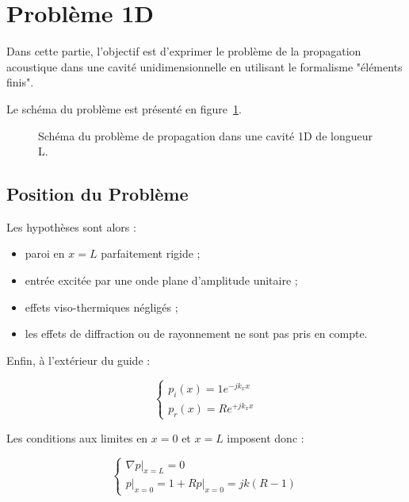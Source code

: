\section{Problème 1D}

Dans cette partie, l'objectif est d'exprimer le problème de la propagation acoustique dans une cavité unidimensionnelle
en utilisant le formalisme "éléments finis".

Le schéma du problème est présenté en figure~\ref{fig:FEM:propa_1D}.

\begin{figure}[!ht]
	\centering
	
	\caption{\label{fig:FEM:propa_1D}Schéma du problème de propagation dans une cavité 1D de longueur L.}
\end{figure}

\subsection{Position du Problème}

Les hypothèses sont alors :

\begin{itemize}
	\item paroi en $x=L$ parfaitement rigide ;
	\item entrée excitée par une onde plane d'amplitude unitaire ;
	\item effets viso-thermiques négligés ;
	\item les effets de diffraction ou de rayonnement ne sont pas pris en compte.
\end{itemize}

Enfin, à l'extérieur du guide :

\begin{equation}
	\left\{
	\begin{array}{l}
		p_i(x) = 1e^{-jk_xx}\\
		p_r(x) = Re^{+jk_xx}
	\end{array}
	\right.\label{FEM1D:expr_ondes}
\end{equation}

Les conditions aux limites en $x=0$ et $x=L$ imposent donc :

\begin{equation}
	\left\{\begin{array}{l}
	\left.\nabla p\right|_{x=L} = 0\\
	\left.p\right|_{x=0} = 1+R
	\left.p\right|_{x=0} = jk(R-1)
	\end{array}\right. \label{FEM1D:BC}
\end{equation}


